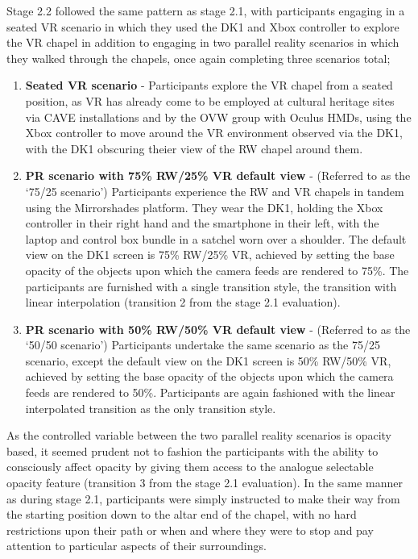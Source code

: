 Stage 2.2 followed the same pattern as stage 2.1, with participants engaging in a seated VR scenario in which they used the DK1 and Xbox controller to explore the VR chapel in addition to engaging in two parallel reality scenarios in which they walked through the chapels, once again completing three scenarios total;

\begin{enumerate}
	\item \textbf{Seated VR scenario} - Participants explore the VR chapel from a seated position, as VR has already come to be employed at cultural heritage sites via CAVE installations and by the OVW group with Oculus HMDs, using the Xbox controller to move around the VR environment observed via the DK1, with the DK1 obscuring theier view of the RW chapel around them.
	\item \textbf{PR scenario with 75\% RW/25\% VR default view} - (Referred to as the `75/25 scenario') Participants experience the RW and VR chapels in tandem using the Mirrorshades platform. They wear the DK1, holding the Xbox controller in their right hand and the smartphone in their left, with the laptop and control box bundle in a satchel worn over a shoulder. The default view on the DK1 screen is 75\% RW/25\% VR, achieved by setting the base opacity of the objects upon which the camera feeds are rendered to 75\%. The participants are furnished with a single transition style, the transition with linear interpolation (transition 2 from the stage 2.1 evaluation).
	\item \textbf{PR scenario with 50\% RW/50\% VR default view} - (Referred to as the `50/50 scenario') Participants undertake the same scenario as the 75/25 scenario, except the default view on the DK1 screen is 50\% RW/50\% VR, achieved by setting the base opacity of the objects upon which the camera feeds are rendered to 50\%. Participants are again fashioned with the linear interpolated transition as the only transition style.
\end{enumerate}

As the controlled variable between the two parallel reality scenarios is opacity based, it seemed prudent not to fashion the participants with the ability to consciously affect opacity by giving them access to the analogue selectable opacity feature (transition 3 from the stage 2.1 evaluation). In the same manner as during stage 2.1, participants were simply instructed to make their way from the starting position down to the altar end of the chapel, with no hard restrictions upon their path or when and where they were to stop and pay attention to particular aspects of their surroundings.


